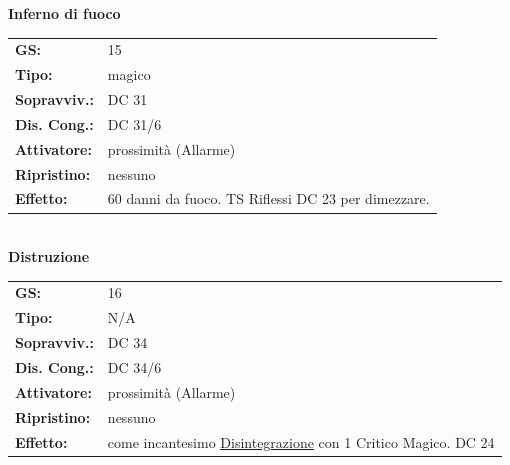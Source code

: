 \begin{multicols}{2}
\textbf{Inferno di fuoco}

\begin{tabularx}{0.48\textwidth}{lX}
	\textbf{GS:} & 15 \\
	\textbf{Tipo:} & magico \\
	\textbf{Sopravviv.:} & DC 31 \\
	\textbf{Dis. Cong.:} & DC 31/6 \\
	\textbf{Attivatore:} & prossimità (Allarme) \\
	\textbf{Ripristino:} & nessuno \\
	\textbf{Effetto:} & 60 danni da fuoco. TS Riflessi DC 23 per dimezzare.
\end{tabularx}\\

\textbf{Distruzione}

\begin{tabularx}{0.48\textwidth}{lX}
	\textbf{GS:} & 16 \\
	\textbf{Tipo:} & N/A \\
	\textbf{Sopravviv.:} & DC 34 \\
	\textbf{Dis. Cong.:} & DC 34/6 \\
	\textbf{Attivatore:} & prossimità (Allarme) \\
	\textbf{Ripristino:} & nessuno \\
	\textbf{Effetto:} & come incantesimo \hyperlink{Disintegrazione}{Disintegrazione} con 1 Critico Magico. DC 24
\end{tabularx}



\end{multicols}

